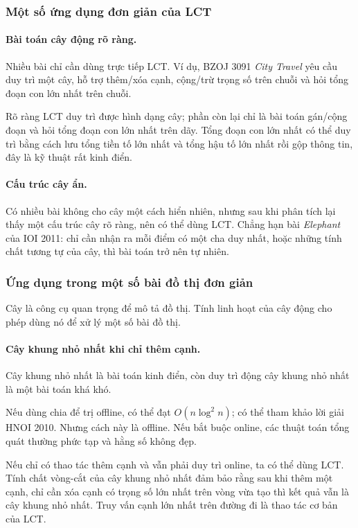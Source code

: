 \documentclass[11pt]{article}
\begin{document}
\subsubsection{Một số ứng dụng đơn giản của LCT}

\paragraph{Bài toán cây động rõ ràng.}
Nhiều bài chỉ cần dùng trực tiếp LCT. Ví dụ, BZOJ 3091 \emph{City Travel} yêu
cầu duy trì một cây, hỗ trợ thêm/xóa cạnh, cộng/trừ trọng số trên chuỗi và hỏi
tổng đoạn con lớn nhất trên chuỗi.

Rõ ràng LCT duy trì được hình dạng cây; phần còn lại chỉ là bài toán gán/cộng
đoạn và hỏi tổng đoạn con lớn nhất trên dãy. Tổng đoạn con lớn nhất có thể duy
trì bằng cách lưu tổng tiền tố lớn nhất và tổng hậu tố lớn nhất rồi gộp thông
tin, đây là kỹ thuật rất kinh điển.

\paragraph{Cấu trúc cây ẩn.}
Có nhiều bài không cho cây một cách hiển nhiên, nhưng sau khi phân tích lại thấy
một cấu trúc cây rõ ràng, nên có thể dùng LCT. Chẳng hạn bài \emph{Elephant} của
IOI 2011: chỉ cần nhận ra mỗi điểm có một cha duy nhất, hoặc những tính chất
tương tự của cây, thì bài toán trở nên tự nhiên.

\subsubsection{Ứng dụng trong một số bài đồ thị đơn giản}

Cây là công cụ quan trọng để mô tả đồ thị. Tính linh hoạt của cây động cho phép
dùng nó để xử lý một số bài đồ thị.

\paragraph{Cây khung nhỏ nhất khi chỉ thêm cạnh.}
Cây khung nhỏ nhất là bài toán kinh điển, còn duy trì động cây khung nhỏ nhất là
một bài toán khá khó.

Nếu dùng chia để trị offline, có thể đạt \(O(n\log^2 n)\); có thể tham khảo lời
giải HNOI 2010. Nhưng cách này là offline. Nếu bắt buộc online, các thuật toán
tổng quát thường phức tạp và hằng số không đẹp.

Nếu chỉ có thao tác thêm cạnh và vẫn phải duy trì online, ta có thể dùng LCT.
Tính chất vòng-cắt của cây khung nhỏ nhất đảm bảo rằng sau khi thêm một cạnh,
chỉ cần xóa cạnh có trọng số lớn nhất trên vòng vừa tạo thì kết quả vẫn là cây
khung nhỏ nhất. Truy vấn cạnh lớn nhất trên đường đi là thao tác cơ bản của LCT.
\end{document}
